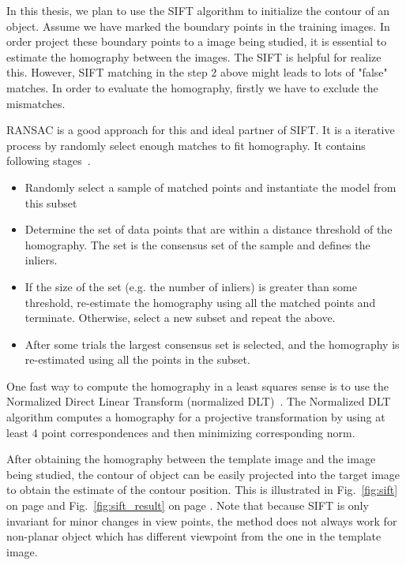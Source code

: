 In this thesis, we plan to use the SIFT algorithm to initialize the
contour of an object. Assume we have marked the boundary points in the
training images. In order project these boundary points to a image
being studied, it is essential to estimate the homography between the
images. The SIFT is helpful for realize this. However, SIFT matching
in the step 2 above might leads to lots of "false" matches. In order
to evaluate the homography, firstly we have to exclude the
mismatches. 

RANSAC is a good approach for this and ideal partner of SIFT. It is a
iterative process by randomly select enough matches to fit
homography. It contains following stages~\cite{fischler1981random}.
\begin{itemize}
\item  Randomly select a sample of matched points and instantiate the
  model from this subset
\item Determine the set of data points that are within a distance
  threshold of the homography. The set is the consensus set of the sample
  and defines the inliers.
\item If the size of the set (e.g. the number of inliers) is greater
  than some threshold, re-estimate the homography using all the matched
  points and terminate. Otherwise, select a new subset and repeat the
  above.
\item After some trials the largest consensus set is selected, and the
  homography is re-estimated using all the points in the subset.
\end{itemize}
One fast way to compute the homography in a least squares sense is to use the Normalized
Direct Linear Transform (normalized
DLT)~\cite{hartley2003multiple}. The Normalized DLT algorithm computes
a homography for a projective transformation by using at least 4 point
correspondences and then minimizing corresponding norm.

After obtaining the homography between the template image and the
image being studied, the contour of object can be easily projected
into the target image to obtain the estimate of the contour
position. This is illustrated in Fig.~\ref{fig:sift} on page
\pageref{fig:sift} and Fig.~\ref{fig:sift_result} on page
\pageref{fig:sift_result}. Note that because SIFT is only invariant for
minor changes in view points, the method does not always work for
non-planar object which has different viewpoint from the one in the
template image.

